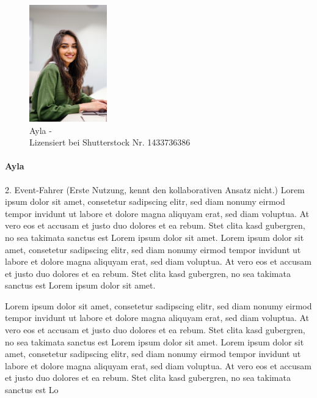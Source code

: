 \bigbreak

\begin{figure}
    \vspace{-\intextsep}
    \centering
    \includegraphics[width=0.3\textwidth]{contents/06_model_evaluation/01_integration/res/persona_picture_ayla.png}
    \caption{Ayla -\\Lizensiert bei Shutterstock Nr. 1433736386}
\end{figure}

\paragraph{Ayla} 2. Event-Fahrer (Erste Nutzung, kennt den kollaborativen Ansatz nicht.) Lorem ipsum dolor sit amet, consetetur sadipscing elitr, sed diam nonumy eirmod tempor invidunt ut labore et dolore magna aliquyam erat, sed diam voluptua. At vero eos et accusam et justo duo dolores et ea rebum. Stet clita kasd gubergren, no sea takimata sanctus est Lorem ipsum dolor sit amet. Lorem ipsum dolor sit amet, consetetur sadipscing elitr, sed diam nonumy eirmod tempor invidunt ut labore et dolore magna aliquyam erat, sed diam voluptua. At vero eos et accusam et justo duo dolores et ea rebum. Stet clita kasd gubergren, no sea takimata sanctus est Lorem ipsum dolor sit amet.

Lorem ipsum dolor sit amet, consetetur sadipscing elitr, sed diam nonumy eirmod tempor invidunt ut labore et dolore magna aliquyam erat, sed diam voluptua. At vero eos et accusam et justo duo dolores et ea rebum. Stet clita kasd gubergren, no sea takimata sanctus est Lorem ipsum dolor sit amet. Lorem ipsum dolor sit amet, consetetur sadipscing elitr, sed diam nonumy eirmod tempor invidunt ut labore et dolore magna aliquyam erat, sed diam voluptua. At vero eos et accusam et justo duo dolores et ea rebum. Stet clita kasd gubergren, no sea takimata sanctus est Lo